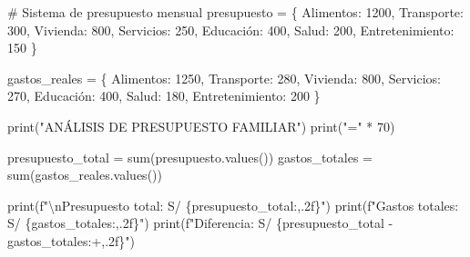 \documentclass[
  doc,
  floatsintext,
  longtable,
  a4paper,
  nolmodern,
  notxfonts,
  notimes,
  12pt,
  colorlinks=true,linkcolor=blue,citecolor=blue,urlcolor=blue]{apa7}
\newenvironment{Shaded}{\begin{snugshade}}{\end{snugshade}}
\newcommand{\BuiltInTok}[1]{\textcolor[rgb]{0.00,0.23,0.31}{#1}}
\newcommand{\CharTok}[1]{\textcolor[rgb]{0.13,0.47,0.30}{#1}}
\newcommand{\CommentTok}[1]{\textcolor[rgb]{0.37,0.37,0.37}{#1}}
\newcommand{\DecValTok}[1]{\textcolor[rgb]{0.68,0.00,0.00}{#1}}
\newcommand{\NormalTok}[1]{\textcolor[rgb]{0.00,0.23,0.31}{#1}}
\newcommand{\OperatorTok}[1]{\textcolor[rgb]{0.37,0.37,0.37}{#1}}
\newcommand{\SpecialCharTok}[1]{\textcolor[rgb]{0.37,0.37,0.37}{#1}}
\newcommand{\SpecialStringTok}[1]{\textcolor[rgb]{0.13,0.47,0.30}{#1}}
\newcommand{\StringTok}[1]{\textcolor[rgb]{0.13,0.47,0.30}{#1}}
\begin{document}
\begin{Shaded}
\begin{Highlighting}[]
\CommentTok{\# Sistema de presupuesto mensual}
\NormalTok{presupuesto }\OperatorTok{=}\NormalTok{ \{}
    \StringTok{\textquotesingle{}Alimentos\textquotesingle{}}\NormalTok{: }\DecValTok{1200}\NormalTok{,}
    \StringTok{\textquotesingle{}Transporte\textquotesingle{}}\NormalTok{: }\DecValTok{300}\NormalTok{,}
    \StringTok{\textquotesingle{}Vivienda\textquotesingle{}}\NormalTok{: }\DecValTok{800}\NormalTok{,}
    \StringTok{\textquotesingle{}Servicios\textquotesingle{}}\NormalTok{: }\DecValTok{250}\NormalTok{,}
    \StringTok{\textquotesingle{}Educación\textquotesingle{}}\NormalTok{: }\DecValTok{400}\NormalTok{,}
    \StringTok{\textquotesingle{}Salud\textquotesingle{}}\NormalTok{: }\DecValTok{200}\NormalTok{,}
    \StringTok{\textquotesingle{}Entretenimiento\textquotesingle{}}\NormalTok{: }\DecValTok{150}
\NormalTok{\}}

\NormalTok{gastos\_reales }\OperatorTok{=}\NormalTok{ \{}
    \StringTok{\textquotesingle{}Alimentos\textquotesingle{}}\NormalTok{: }\DecValTok{1250}\NormalTok{,}
    \StringTok{\textquotesingle{}Transporte\textquotesingle{}}\NormalTok{: }\DecValTok{280}\NormalTok{,}
    \StringTok{\textquotesingle{}Vivienda\textquotesingle{}}\NormalTok{: }\DecValTok{800}\NormalTok{,}
    \StringTok{\textquotesingle{}Servicios\textquotesingle{}}\NormalTok{: }\DecValTok{270}\NormalTok{,}
    \StringTok{\textquotesingle{}Educación\textquotesingle{}}\NormalTok{: }\DecValTok{400}\NormalTok{,}
    \StringTok{\textquotesingle{}Salud\textquotesingle{}}\NormalTok{: }\DecValTok{180}\NormalTok{,}
    \StringTok{\textquotesingle{}Entretenimiento\textquotesingle{}}\NormalTok{: }\DecValTok{200}
\NormalTok{\}}

\BuiltInTok{print}\NormalTok{(}\StringTok{"ANÁLISIS DE PRESUPUESTO FAMILIAR"}\NormalTok{)}
\BuiltInTok{print}\NormalTok{(}\StringTok{"="} \OperatorTok{*} \DecValTok{70}\NormalTok{)}

\NormalTok{presupuesto\_total }\OperatorTok{=} \BuiltInTok{sum}\NormalTok{(presupuesto.values())}
\NormalTok{gastos\_totales }\OperatorTok{=} \BuiltInTok{sum}\NormalTok{(gastos\_reales.values())}

\BuiltInTok{print}\NormalTok{(}\SpecialStringTok{f"}\CharTok{\textbackslash{}n}\SpecialStringTok{Presupuesto total: S/ }\SpecialCharTok{\{}\NormalTok{presupuesto\_total}\SpecialCharTok{:,.2f\}}\SpecialStringTok{"}\NormalTok{)}
\BuiltInTok{print}\NormalTok{(}\SpecialStringTok{f"Gastos totales: S/ }\SpecialCharTok{\{}\NormalTok{gastos\_totales}\SpecialCharTok{:,.2f\}}\SpecialStringTok{"}\NormalTok{)}
\BuiltInTok{print}\NormalTok{(}\SpecialStringTok{f"Diferencia: S/ }\SpecialCharTok{\{}\NormalTok{presupuesto\_total }\OperatorTok{{-}}\NormalTok{ gastos\_totales}\SpecialCharTok{:+,.2f\}}\SpecialStringTok{"}\NormalTok{)}


\end{Highlighting}
\end{Shaded}
\end{document}

